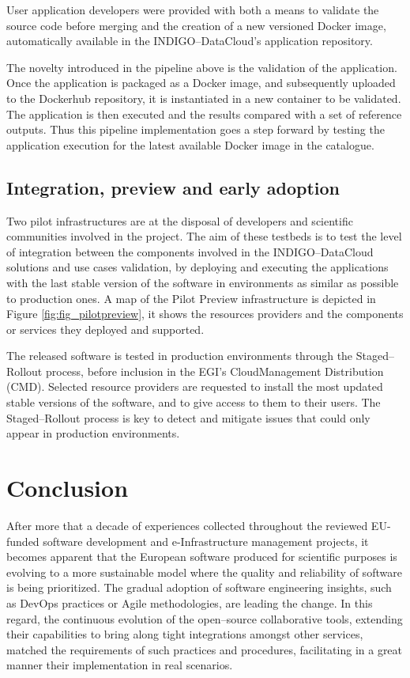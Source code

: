 \documentclass[journal]{IEEEtran}
\begin{document}
User application developers were provided with both a means to validate the
source code before merging and the creation of a new versioned Docker image,
automatically available in the INDIGO--DataCloud’s application repository.

The novelty introduced in the pipeline above is the validation of the application.
Once the application is packaged as a Docker image, and subsequently uploaded
to the Dockerhub repository, it is instantiated in a new container to be validated.
The application is then executed and the results compared with a set of reference outputs.
Thus this pipeline implementation goes a step forward by testing the application
execution for the latest available Docker image in the catalogue.


\subsection{Integration, preview and early adoption}

Two pilot infrastructures are at the disposal of developers and scientific
communities involved in the project. The aim of these testbeds is to test the
level of integration between the components involved in the INDIGO--DataCloud
solutions and use cases validation, by deploying and executing the applications
with the last stable version of the software in environments as similar as 
possible to production ones. A map of the Pilot Preview
infrastructure is depicted in Figure \ref{fig:fig_pilotpreview}, it shows the
resources providers and the components or services they deployed and supported.

The released software is tested in production environments through the
Staged--Rollout process, before inclusion in the EGI's CloudManagement Distribution (CMD). 
Selected resource providers are requested to install
the most updated stable versions of the software, and to give access to them to their users. The
Staged--Rollout process is key to detect and mitigate issues that could only
appear in production environments.

\section{Conclusion}
\label{sec:con}

After more that a decade of experiences collected throughout the reviewed 
EU-funded software development and e-Infrastructure management projects, it 
becomes apparent that the European software produced for scientific purposes is
evolving to a more sustainable model where the quality and reliability of
software is being prioritized. The gradual adoption of software engineering insights, such as
DevOps practices or Agile methodologies, are leading the change. In this regard, the continuous evolution of the open--source
collaborative tools, extending their capabilities to bring along tight 
integrations amongst other services, matched the requirements of such practices
and procedures, facilitating in a great manner their implementation in real scenarios.
\end{document}

